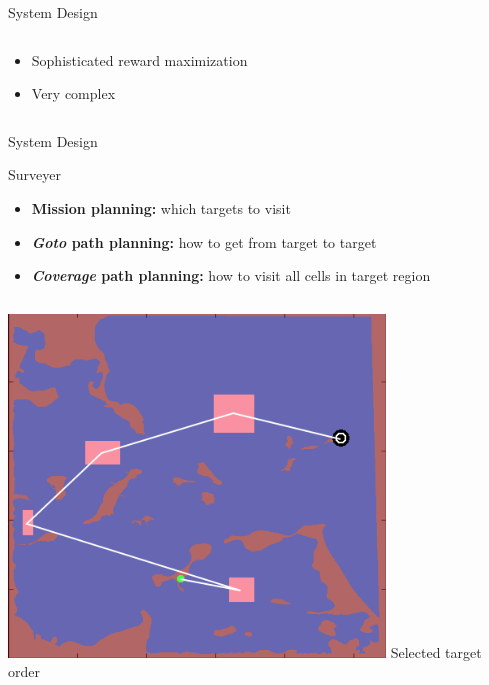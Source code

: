 \documentclass[9pt]{beamer}
\begin{document}
\begin{frame}{System Design}
\begin{columns}
\begin{column}{0.5\textwidth}
\begin{center}
                \begin{itemize}
                        \item Sophisticated reward maximization
    	                \item Very complex
                \end{itemize}  
            \end{center}
        \end{column}
    \end{columns}    
\end{frame}


\begin{frame}{System Design}
    \begin{block}{Surveyer}
        \begin{itemize}
            \item \textbf{Mission planning:} which targets to visit
    	    \item \textbf{\textit{Goto} path planning:} how to get from target to target
    	    \item \textbf{\textit{Coverage} path planning:} how to visit all cells in target region
        \end{itemize}  
    \end{block}
    \begin{columns}
        \begin{column}{0.5\textwidth}
            \begin{center}
                \includegraphics[width=0.75\textwidth,trim={0cm 0cm 0cm 0cm},clip]{img/surveyor_1.png}
                \newline
                Selected target order
            \end{center}

\end{column}
\end{columns}
\end{frame}
\end{document}
